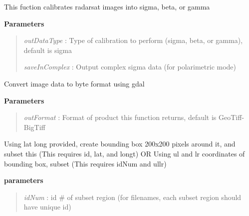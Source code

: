\documentclass[letterpaper,10pt,openany,oneside]{sphinxmanual}
\begin{document}
\begin{fulllineitems}
\begin{fulllineitems}
\end{fulllineitems}


\begin{fulllineitems}
\label{code:Image.Image.snapCalibration}
This fuction calibrates radarsat images into sigma, beta, or gamma

\textbf{Parameters}
\begin{quote}

\emph{outDataType} : Type of calibration to perform (sigma, beta, or gamma), default is sigma

\emph{saveInComplex} : Output complex sigma data (for polarimetric mode)
\end{quote}

\end{fulllineitems}


\begin{fulllineitems}
\label{code:Image.Image.snapDataTypeConv}
Convert image data to byte format using gdal

\textbf{Parameters}
\begin{quote}

\emph{outFormat} : Format of product this function returns, default is GeoTiff-BigTiff
\end{quote}

\end{fulllineitems}


\begin{fulllineitems}
\label{code:Image.Image.snapSubset}
Using lat long provided, create bounding box 200x200 pixels around it, and subset this
(This requires id, lat, and longt)
OR
Using ul and lr coordinates of bounding box, subset
(This requires idNum and ullr)

\textbf{parameters}
\begin{quote}

\emph{idNum} : id \# of subset region (for filenames, each subset region should have unique id)


\end{quote}
\end{fulllineitems}
\end{fulllineitems}
\end{document}
